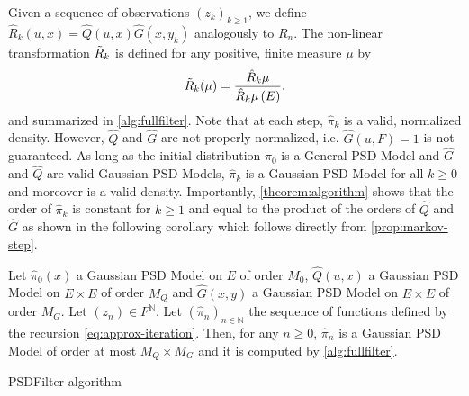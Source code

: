Given a sequence of observations $(z_k)_{k\geq 1}$, we define $\hat R_k(u, x) = \hat Q(u, x)\hat G(x, y_k)$ analogously to $R_n$. The non-linear transformation $\tilde{{R}}_k$ is defined for any positive, finite measure $\mu$ by
\begin{align}\label{eq:approx-iteration}
    \tilde{{R}}_k (\mu) = \frac{\hat R_k\mu}{\hat R_k\mu\,(E)}.
\end{align}
and summarized in \cref{alg:fullfilter}.
Note that at each step, $\hat \pi_k$ is a valid, normalized density. However, $\hat Q$ and $\hat G$ are not properly normalized, i.e. $\hat G(u, F) =1$ is not guaranteed.
%
As long as the initial distribution $\hat \pi_0$ is a General PSD Model and $\hat G$ and $\hat Q$ are valid Gaussian PSD Models, $\hat \pi_k$ is a Gaussian PSD Model for all $k\geq 0$ and moreover is a valid density. Importantly, \cref{theorem:algorithm} shows that the order of $\hat \pi_k$ is constant for $k\geq 1$ and equal to the product of the orders of $\hat Q$ and $\hat G$ as shown in the following corollary which follows directly from \cref{prop:markov-step}.
\begin{corollary} \label{theorem:algorithm}
    Let $\hat \pi_0(x)$ a Gaussian PSD Model on $E$ of order $M_0$, $\hat Q(u, x)$ a Gaussian PSD Model on $E\times E$ of order $M_Q$ and $\hat G(x, y)$ a Gaussian PSD Model on $E\times E$ of order $M_G$. Let $(z_n)\in F^\mathbb N$. Let $(\hat \pi_n)_{n\in\mathbb N}$ the sequence of functions defined by the recursion \cref{eq:approx-iteration}. Then, for any $n\geq 0$, $\hat \pi_n$ is a Gaussian PSD Model of order at most $M_Q \times M_G$ and it is computed by \cref{alg:fullfilter}.
\end{corollary}


\begin{algorithm}[ht!]
\caption{PSDFilter algorithm}\label{alg:fullfilter}
{}
\end{algorithm}

